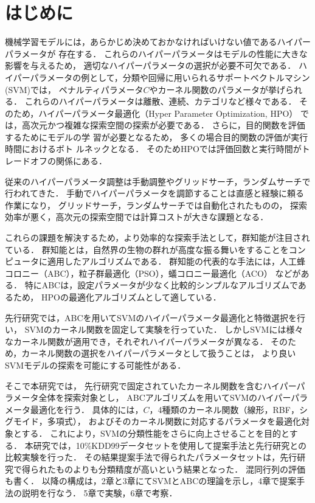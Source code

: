 \section{はじめに}
機械学習モデルには，あらかじめ決めておかなければいけない値であるハイパーパラメータが
存在する．
これらのハイパーパラメータはモデルの性能に大きな影響を与えるため，
適切なハイパーパラメータの選択が必要不可欠である\cite{essential}．
ハイパーパラメータの例として，分類や回帰に用いられるサポートベクトルマシン(SVM)では，
ペナルティパラメータ$C$やカーネル関数のパラメータが挙げられる．
これらのハイパーパラメータは離散、連続、カテゴリなど様々である．
そのため，ハイパーパラメータ最適化（Hyper Parameter Optimization, HPO）
では，高次元かつ複雑な探索空間の探索が必要である．
さらに，目的関数を評価するためにモデルの学
習が必要となるため，
多くの場合目的関数の評価が実行時間におけるボト
ルネックとなる．
そのためHPOでは評価回数と実行時間がトレードオフの関係にある\cite{trade}．

従来のハイパーパラメータ調整は手動調整やグリッドサーチ，ランダムサーチで行われてきた．
手動でハイパーパラメータを調節することは直感と経験に頼る作業になり，
グリッドサーチ，ランダムサーチでは自動化されたものの，
探索効率が悪く，高次元の探索空間では計算コストが大きな課題となる．

これらの課題を解決するため，より効率的な探索手法として，群知能が注目されている．
群知能とは，自然界の生物の群れが高度な振る舞いをすることをコンピュータに適用したアルゴリズムである\cite{population}．
群知能の代表的な手法には，人工蜂コロニー（ABC），粒子群最適化（PSO），蟻コロニー最適化（ACO）
などがある．
特にABCは，設定パラメータが少なく比較的シンプルなアルゴリズムであるため，
HPOの最適化アルゴリズムとして適している．

先行研究では，ABCを用いてSVMのハイパーパラメータ最適化と特徴選択を行い，
SVMのカーネル関数を固定して実験を行っていた\cite{origin}．
しかしSVMには様々なカーネル関数が適用でき，それぞれハイパーパラメータが異なる．
そのため，カーネル関数の選択をハイパーパラメータとして扱うことは，
より良いSVMモデルの探索を可能にする可能性がある．

そこで本研究では，
先行研究で固定されていたカーネル関数を含むハイパーパラメータ全体を探索対象とし，
ABCアルゴリズムを用いてSVMのハイパーパラメータ最適化を行う．
具体的には，$C$，4種類のカーネル関数（線形，RBF，シグモイド，多項式），
およびそのカーネル関数に対応するパラメータを最適化対象とする．
これにより，SVMの分類性能をさらに向上させることを目的とする．
 本研究では，10\%KDD99データセットを使用して提案手法と先行研究との比較実験を行った．
その結果提案手法で得られたパラメータセットは，先行研究で得られたものよりも分類精度が高いという結果となった．
混同行列の評価も書く．
以降の構成は，2章と3章にてSVMとABCの理論を示し，4章で提案手法の説明を行なう．
5章で実験，6章で考察．
